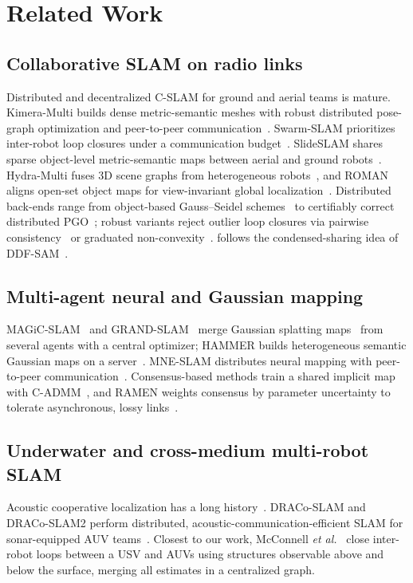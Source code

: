 \section{Related Work}
\label{sec:related}

\subsection{Collaborative SLAM on radio links}
Distributed and decentralized C-SLAM for ground and aerial teams is mature. Kimera-Multi builds
dense metric-semantic meshes with robust distributed pose-graph optimization and peer-to-peer
communication~\cite{tian2022kimeramulti}. Swarm-SLAM prioritizes inter-robot loop closures under
a communication budget~\cite{lajoie2024swarmslam}. SlideSLAM shares sparse object-level
metric-semantic maps between aerial and ground robots~\cite{liu2025slideslam}. Hydra-Multi
fuses 3D scene graphs from heterogeneous robots~\cite{chang2023hydramulti}, and ROMAN aligns
open-set object maps for view-invariant global localization~\cite{peterson2025roman}.
Distributed back-ends range from object-based Gauss--Seidel schemes~\cite{choudhary2017dgs} to
certifiably correct distributed PGO~\cite{tian2021dpgo}; robust variants reject outlier loop
closures via pairwise consistency~\cite{mangelson2018pcm} or graduated
non-convexity~\cite{yang2020gnc}. \avatar{} follows the condensed-sharing idea of
DDF-SAM~\cite{cunningham2010ddfsam, cunningham2013ddfsam2}. 

\subsection{Multi-agent neural and Gaussian mapping}
MAGiC-SLAM~\cite{yugay2025magic} and GRAND-SLAM~\cite{thomas2025grandslam} merge Gaussian
splatting maps~\cite{kerbl2023gs} from several agents with a central optimizer; HAMMER builds
heterogeneous semantic Gaussian maps on a server~\cite{yu2025hammer}. MNE-SLAM distributes
neural mapping with peer-to-peer communication~\cite{deng2025mneslam}. Consensus-based methods
train a shared implicit map with C-ADMM~\cite{yu2022dinno}, and RAMEN weights consensus by
parameter uncertainty to tolerate asynchronous, lossy links~\cite{zhao2025ramen}.

\subsection{Underwater and cross-medium multi-robot SLAM}
Acoustic cooperative localization has a long history~\cite{bahr2009cl}. DRACo-SLAM and
DRACo-SLAM2 perform distributed, acoustic-communication-efficient SLAM for sonar-equipped AUV
teams~\cite{mcconnell2022draco, huang2025draco2}. Closest to our work, McConnell
\textit{et al.}~\cite{mcconnell2026aboveandbelow} close inter-robot loops between a USV and
AUVs using structures observable above and below the surface, merging all estimates in a
centralized graph. 

